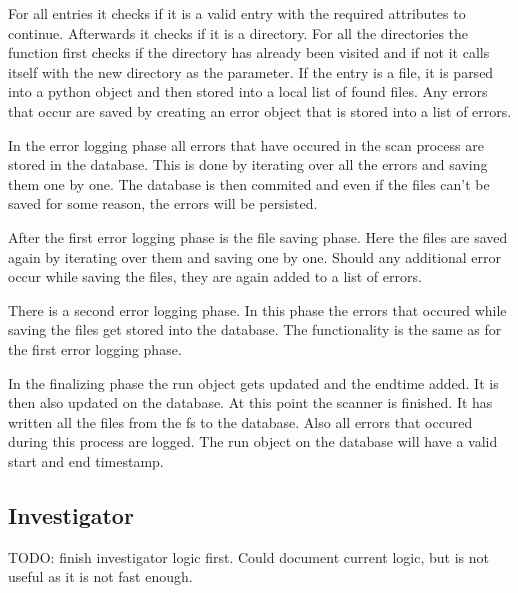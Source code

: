 For all entries it checks if it is a valid entry with the required attributes to continue. Afterwards it checks if it is a directory. For all the directories the function first checks if the directory has already been visited and if not it calls itself with the new directory as the parameter. If the entry is a file, it is parsed into a python object and then stored into a local list of found files. Any errors that occur are saved by creating an error object that is stored into a list of errors.

In the error logging phase all errors that have occured in the scan process are stored in the database. This is done by iterating over all the errors and saving them one by one. The database is then commited and even if the files can't be saved for some reason, the errors will be persisted.

After the first error logging phase is the file saving phase. Here the files are saved again by iterating over them and saving one by one. Should any additional error occur while saving the files, they are again added to a list of errors. 

There is a second error logging phase. In this phase the errors that occured while saving the files get stored into the database. The functionality is the same as for the first error logging phase.

In the finalizing phase the run object gets updated and the endtime added. It is then also updated on the database. At this point the scanner is finished. It has written all the files from the \gls{fs} to the database. Also all errors that occured during this process are logged. The run object on the database will have a valid start and end timestamp. 


\subsection{Investigator}
\label{sec:Investigator}

TODO: finish investigator logic first. Could document current logic, but is not useful as it is not fast enough. 


